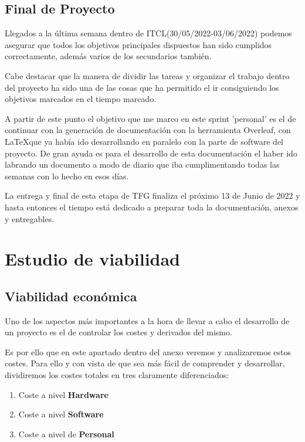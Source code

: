\subsection{\textbf{Final de Proyecto}}
Llegados a la última semana dentro de ITCL\cite{itcl}(30/05/2022-03/06/2022) podemos asegurar que todos los objetivos principales dispuestos han sido cumplidos correctamente, además varios de los secundarios también.

Cabe destacar que la manera de dividir las tareas y organizar el trabajo dentro del proyecto ha sido una de las cosas que ha permitido el ir consiguiendo los objetivos marcados en el tiempo marcado.

A partir de este punto el objetivo que me marco en este sprint 'personal' es el de continuar con la generación de documentación con la herramienta Overleaf, con \LaTeX que ya había ido desarrollando en paralelo con la parte de software del proyecto. De gran ayuda es para el desarrollo de esta documentación el haber ido labrando un documento a modo de diario que iba cumplimentando todas las semanas con lo hecho en esos días.

La entrega y final de esta etapa de TFG finaliza el próximo 13 de Junio de 2022 y hasta entonces el tiempo está dedicado a preparar toda la documentación, anexos y entregables.

\newpage

\section{Estudio de viabilidad}

\subsection{Viabilidad económica}
Uno de los aspectos más importantes a la hora de llevar a cabo el desarrollo de un proyecto es el de controlar los costes y derivados del mismo.

Es por ello que en este apartado dentro del anexo veremos y analizaremos estos costes. Para ello y con vista de que sea más fácil de comprender y desarrollar, dividiremos los costes totales en tres claramente diferenciados: \begin{enumerate}
    \item Coste a nivel \textbf{Hardware} 
    \item Coste a nivel \textbf{Software}
    \item Coste a nivel de \textbf{Personal}
\end{enumerate}

